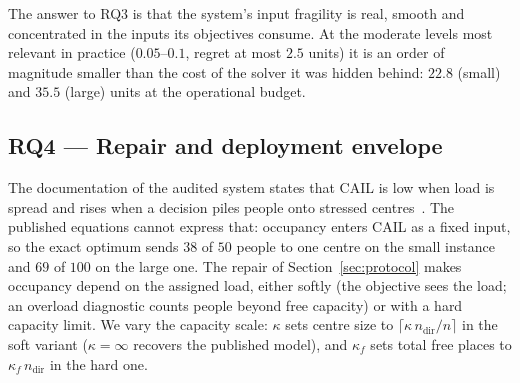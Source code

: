 \documentclass[systems,article,submit,moreauthors,pdftex]{Definitions/mdpi}
\begin{document}
The answer to RQ3 is that the system's input fragility is real, smooth and concentrated in
the inputs its objectives consume. At the moderate levels most relevant in practice
($0.05$--$0.1$, regret at most $2.5$ units) it is an order of magnitude smaller than the
cost of the solver it was hidden behind: $22.8$ (small) and $35.5$ (large) units at the
operational budget.

\subsection{RQ4 --- Repair and deployment envelope}\label{sec:rq4}
The documentation of the audited system states that CAIL is low when load is spread and
rises when a decision piles people onto stressed centres~\cite{rabiei2026resilient}. The
published equations cannot express that: occupancy enters CAIL as a fixed input, so the
exact optimum sends $38$ of $50$ people to one centre on the small instance and $69$ of
$100$ on the large one. The repair of Section~\ref{sec:protocol} makes occupancy depend on
the assigned load, either softly (the objective sees the load; an overload diagnostic counts
people beyond free capacity) or with a hard capacity limit. We vary the capacity scale:
$\kappa$ sets centre size to $\lceil\kappa\, n_{\mathrm{dir}}/n\rceil$ in the soft variant
($\kappa = \infty$ recovers the published model), and $\kappa_f$ sets total free places to
$\kappa_f\, n_{\mathrm{dir}}$ in the hard one.
\end{document}
